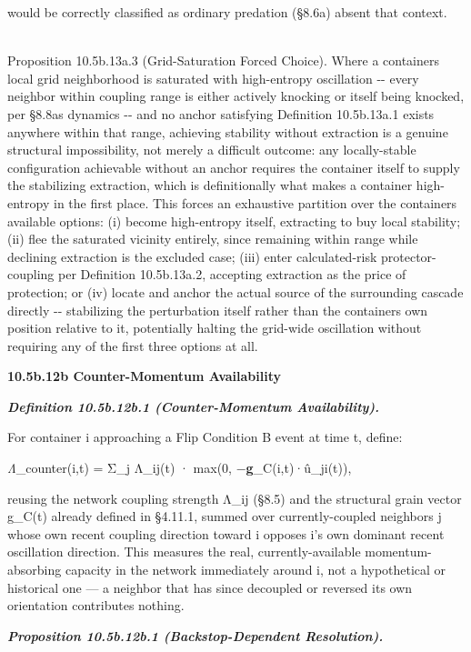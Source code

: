 \documentclass[
]{article}
\begin{document}
would be correctly classified as ordinary predation (§8.6a) absent that
context.\\
\strut \\
Proposition 10.5b.13a.3 (Grid-Saturation Forced Choice). Where a
container\textquotesingle s local grid neighborhood is saturated with
high-entropy oscillation -\/- every neighbor within coupling range is
either actively knocking or itself being knocked, per
§8.8a\textquotesingle s dynamics -\/- and no anchor satisfying
Definition 10.5b.13a.1 exists anywhere within that range, achieving
stability without extraction is a genuine structural impossibility, not
merely a difficult outcome: any locally-stable configuration achievable
without an anchor requires the container itself to supply the
stabilizing extraction, which is definitionally what makes a container
high-entropy in the first place. This forces an exhaustive partition
over the container\textquotesingle s available options: (i) become
high-entropy itself, extracting to buy local stability; (ii) flee the
saturated vicinity entirely, since remaining within range while
declining extraction is the excluded case; (iii) enter calculated-risk
protector-coupling per Definition 10.5b.13a.2, accepting extraction as
the price of protection; or (iv) locate and anchor the actual source of
the surrounding cascade directly -\/- stabilizing the perturbation
itself rather than the container\textquotesingle s own position relative
to it, potentially halting the grid-wide oscillation without requiring
any of the first three options at all.

\textbf{10.5b.12b Counter-Momentum Availability}

\emph{\textbf{Definition 10.5b.12b.1 (Counter-Momentum Availability).}}

For container i approaching a Flip Condition B event at time t, define:

\emph{Λ}\_counter(i,t) = Σ\_j Λ\_ij(t) · max(0,
−\textbf{g}\_C(i,t)·û\_ji(t)),

reusing the network coupling strength Λ\_ij (§8.5) and the structural
grain vector g\_C(t) already defined in §4.11.1, summed over
currently-coupled neighbors j whose own recent coupling direction toward
i opposes i's own dominant recent oscillation direction. This measures
the real, currently-available momentum-absorbing capacity in the network
immediately around i, not a hypothetical or historical one --- a
neighbor that has since decoupled or reversed its own orientation
contributes nothing.

\emph{\textbf{Proposition 10.5b.12b.1 (Backstop-Dependent Resolution).}}
\end{document}
